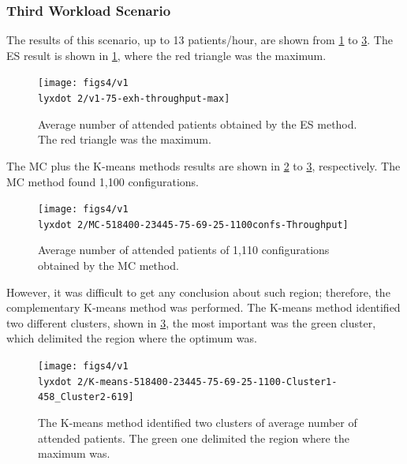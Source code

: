 \clearpage{}


\subsubsection{Third Workload Scenario}

The results of this scenario, up to 13 patients/hour, are shown from
\ref{subfig:es12-5} to \ref{subfig:km12-5}. The ES result is shown
in \ref{subfig:es12-5}, where the red triangle was the maximum. 
\begin{figure}[H]
\centering{}\texttt{[image: figs4/v1\\lyxdot 2/v1-75-exh-throughput-max]}\caption{Average number of attended patients obtained by the ES method. The
red triangle was the maximum.\label{subfig:es12-5}}
\end{figure}


The MC plus the K-means methods results are shown in \ref{subfig:mc12-5}
to \ref{subfig:km12-5}, respectively. The MC method found 1,100 configurations.
\begin{figure}[H]
\centering{}\texttt{[image: figs4/v1\\lyxdot 2/MC-518400-23445-75-69-25-1100confs-Throughput]}\caption{Average number of attended patients of 1,110 configurations obtained
by the MC method.\label{subfig:mc12-5}}
\end{figure}
However, it was difficult to get any conclusion about such region;
therefore, the complementary K-means method was performed. The K-means
method identified two different clusters, shown in \ref{subfig:km12-5},
the most important was the green cluster, which delimited the region
where the optimum was.
\begin{figure}[H]
\begin{centering}
\texttt{[image: figs4/v1\\lyxdot 2/K-means-518400-23445-75-69-25-1100-Cluster1-458\_Cluster2-619]}
\par\end{centering}

\caption{The K-means method identified two clusters of average number of attended
patients. The green one delimited the region where the maximum was.\label{subfig:km12-5}}
\end{figure}


